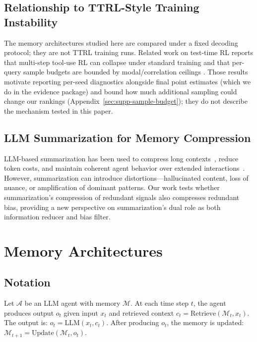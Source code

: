 \documentclass[11pt]{article}
\begin{document}
\subsection{Relationship to TTRL-Style Training Instability}
The memory architectures studied here are compared under a fixed decoding protocol; they are not TTRL training runs. Related work on test-time RL reports that multi-step tool-use RL can collapse under standard training \citep{hao2026tooluse,liang2026mirage} and that per-query sample budgets are bounded by modal/correlation ceilings \citep{bay2026sampling}. Those results motivate reporting per-seed diagnostics alongside final point estimates (which we do in the evidence package) and bound how much additional sampling could change our rankings (Appendix~\ref{sec:supp-sample-budget}); they do not describe the mechanism tested in this paper.

\subsection{LLM Summarization for Memory Compression}

LLM-based summarization has been used to compress long contexts~\cite{liu2023lost}, reduce token costs, and maintain coherent agent behavior over extended interactions~\cite{wu2024memochat}. However, summarization can introduce distortions---hallucinated content, loss of nuance, or amplification of dominant patterns. Our work tests whether summarization's compression of redundant signals also compresses redundant bias, providing a new perspective on summarization's dual role as both information reducer and bias filter.


\section{Memory Architectures}

\subsection{Notation}

Let $\mathcal{A}$ be an LLM agent with memory $\mathcal{M}$. At each time step $t$, the agent produces output $o_t$ given input $x_t$ and retrieved context $c_t = \text{Retrieve}(\mathcal{M}_t, x_t)$. The output is: $o_t = \text{LLM}(x_t, c_t)$. After producing $o_t$, the memory is updated: $\mathcal{M}_{t+1} = \text{Update}(\mathcal{M}_t, o_t)$.
\end{document}
